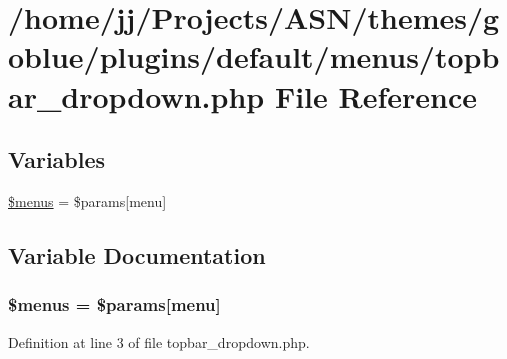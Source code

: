 \hypertarget{topbar__dropdown_8php}{}\section{/home/jj/\+Projects/\+A\+S\+N/themes/goblue/plugins/default/menus/topbar\+\_\+dropdown.php File Reference}
\label{topbar__dropdown_8php}
\subsection*{Variables}
\begin{DoxyCompactItemize}
\item 
\hyperlink{topbar__dropdown_8php_a681cf86fb2440a8c89c88603a08670ba}{\$menus} = \$params\mbox{[}\textquotesingle{}menu\textquotesingle{}\mbox{]}
\end{DoxyCompactItemize}


\subsection{Variable Documentation}
\subsubsection[{\texorpdfstring{\$menus}{$menus}}]{\setlength{\rightskip}{0pt plus 5cm}\$menus = \$params\mbox{[}\textquotesingle{}menu\textquotesingle{}\mbox{]}}\hypertarget{topbar__dropdown_8php_a681cf86fb2440a8c89c88603a08670ba}{}\label{topbar__dropdown_8php_a681cf86fb2440a8c89c88603a08670ba}


Definition at line 3 of file topbar\+\_\+dropdown.\+php.

